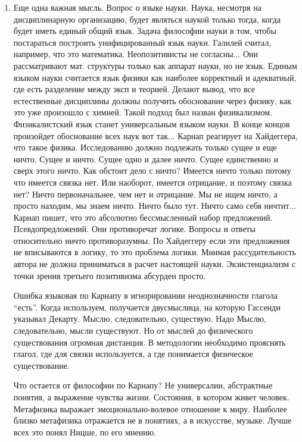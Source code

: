 \documentclass[a4paper, 12pt]{article}
\begin{document}
\begin{enumerate}
  \item Еще одна важная мысль. Вопрос о языке науки. Наука, несмотря на 
    дисциплинарную организацию, будет являться наукой только тогда, 
    когда будет иметь единый общий язык. Задача философии науки в том, 
    чтобы постараться построить унифицированный язык науки. Галилей 
    считал, например, что это математика. Неопозитивисты не согласны... 
    Они рассматривают мат. структуры только как аппарат науки, но не 
    язык. Единым языком науки считается язык физики как наиболее 
    корректный и адекватный, где есть разделение между эксп и теорией. 
    Делают вывод, что все естественные дисциплины должны получить 
    обоснование через физику, как это уже произошло с химией. Такой 
    подход был назван физикализмом. Физикалистский язык станет 
    универсальным языком науки. В конце концов произойдет обоснование 
    всех наук вот так... Карнап реагирует на Хайдеггера, что такое 
    физика. Исследованию должно подлежать только сущее и еще ничто. 
    Сущее и ничто. Сущее одно и далее ничто. Сущее единственно и сверх 
    этого ничто. Как обстоит дело с ничто? Имеется ничто только потому 
    что имеется связка нет. Или наоборот, имеется отрицание, и поэтому 
    связка нет? Ничто первоначальнее, чем нет и отрицание. Мы не ищем 
    ничто, а просто находим, мы знаем ничто. Ничто было тут. Ничто само 
    себя ничтит... Карнап пишет, что это абсолютно бессмысленный набор 
    предложений. Псевдопредложений. Они противоречат логике. Вопросы 
    и ответы относительно ничто противоразумны. По Хайдеггеру если эти 
    предложения не вписываются в логику, то это проблема логики. Мнимая 
    рассудительность автора не должна приниматься в расчет настоящей 
    науки. Экзистенциализм с точки зрения третьего позитивизма абсурден 
    просто.

    Ошибка языковая по Карнапу в игнорировании неоднозначности глагола 
    ``есть''. Когда используем, получается двусмыслица, на которую 
    Гассенди указывал Декарту. Мыслю, следовательно, существую. Надо 
    Мыслю, следовательно, мысли существуют. Но от мыслей до физического 
    существования огромная дистанция. В методологии необходимо прояснять 
    глагол, где для связки используется, а где понимается физическое 
    существование.

    Что остается от философии по Карнапу? Не универсалии, абстрактные 
    понятия, а выражение чувства жизни. Состояния, в котором живет 
    человек. Метафизика выражает эмоционально-волевое отношение к миру. 
    Наиболее близко метафизика отражается не в понятиях, а в искусстве, 
    музыке. Лучше всех это понял Ницше, по его мнению.
\end{enumerate}
\end{document}
